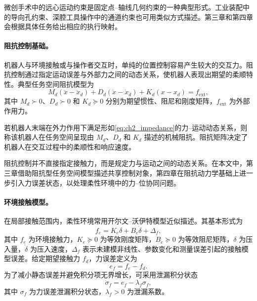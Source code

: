\begin{remark}
微创手术中的远心运动约束是固定点--轴线几何约束的一种典型形式。工业装配中的导向孔约束、深腔工具操作中的通道约束也可用类似方式描述。第三章和第四章会根据具体任务给出相应的执行映射。
\end{remark}

\paragraph{阻抗控制基础。}
\label{subsec:ch2_impedance}

机器人与环境接触或与操作者交互时，单纯的位置控制容易产生较大的交互力。阻抗控制通过指定运动误差与外部力之间的动态关系，使机器人表现出期望的柔顺特性。典型任务空间阻抗模型为
\begin{equation}
  M_d(\ddot x-\ddot x_d)+D_d(\dot x-\dot x_d)+K_d(x-x_d)=f_{\mathrm{ext}},
  \label{eq:ch2_impedance}
\end{equation}
其中 $M_d\succ0$、$D_d\succ0$ 和 $K_d\succeq0$ 分别为期望惯性、阻尼和刚度矩阵，$f_{\mathrm{ext}}$ 为外部作用力。

\begin{definition}[任务空间阻抗]
\label{def:ch2_impedance}
若机器人末端在外力作用下满足形如\eqref{eq:ch2_impedance}的力--运动动态关系，则称该机器人在任务空间呈现由 $M_d$、$D_d$ 和 $K_d$ 描述的机械阻抗。阻抗矩阵决定了机器人在交互过程中的柔顺性和响应速度。
\end{definition}

阻抗控制并不直接指定接触力，而是规定力与运动之间的动态关系。在本文中，第三章借助阻抗型任务空间模型描述共享控制对象，第四章在阻抗动力学基础上进一步引入力误差状态，以处理柔性环境中的力--位协同问题。

\paragraph{环境接触模型。}
\label{subsec:ch2_contact_model}

在局部接触范围内，柔性环境常用开尔文--沃伊特模型近似描述。其基本形式为
\begin{equation}
  f_e=K_e\delta+B_e\dot\delta+\Delta_f,
  \label{eq:ch2_kelvin_voigt}
\end{equation}
其中 $f_e$ 为环境接触力，$K_e\succeq0$ 为等效刚度矩阵，$B_e\succeq0$ 为等效阻尼矩阵，$\delta$ 为压入量，$\dot\delta$ 为压入速度，$\Delta_f$ 表示未建模非线性、参数变化和测量误差引起的接触模型误差。给定期望接触力 $f_d$，力误差定义为
\begin{equation}
  e_f=f_e-f_d .
  \label{eq:ch2_force_error}
\end{equation}
为了减小静态误差并避免积分项无界增长，可采用泄漏积分状态
\begin{equation}
  \dot\sigma_f=e_f-\lambda_f\sigma_f,
  \label{eq:ch2_leakage_integral}
\end{equation}
其中 $\sigma_f$ 为力误差泄漏积分状态，$\lambda_f>0$ 为泄漏系数。

